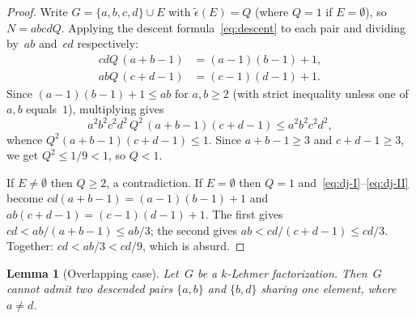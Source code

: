 \documentclass[11pt]{article}
\newtheorem{lemma}[theorem]{Lemma}
\theoremstyle{definition}
\theoremstyle{remark}
\newcommand{\eps}{\tilde{\epsilon}}
\begin{document}
\begin{proof}
Write $G = \{a, b, c, d\} \cup E$ with $\eps(E) = Q$ (where $Q = 1$ if
$E = \emptyset$), so $N = abcdQ$.  Applying the descent
formula~\eqref{eq:descent} to each pair and dividing by~$ab$ and~$cd$
respectively:
\begin{align}
  \label{eq:dj-I}
  cdQ\,(a+b-1) &= (a\!-\!1)(b\!-\!1)+1, \\
  \label{eq:dj-II}
  abQ\,(c+d-1) &= (c\!-\!1)(d\!-\!1)+1.
\end{align}
Since $(a-1)(b-1) + 1 \le ab$ for $a,b \ge 2$ (with strict inequality
unless one of $a, b$ equals~$1$), multiplying gives
\[
  a^2b^2c^2d^2\,Q^2\,(a\!+\!b\!-\!1)(c\!+\!d\!-\!1) \le a^2b^2c^2d^2,
\]
whence $Q^2(a+b-1)(c+d-1) \le 1$.  Since $a+b-1 \ge 3$ and $c+d-1 \ge 3$,
we get $Q^2 \le 1/9 < 1$, so $Q < 1$.

If $E \ne \emptyset$ then $Q \ge 2$, a contradiction.  If
$E = \emptyset$ then $Q = 1$ and~\eqref{eq:dj-I}--\eqref{eq:dj-II} become
$cd(a+b-1) = (a-1)(b-1)+1$ and $ab(c+d-1) = (c-1)(d-1)+1$.  The first
gives $cd < ab/(a+b-1) \le ab/3$; the second gives $ab < cd/(c+d-1) \le
cd/3$.  Together: $cd < ab/3 < cd/9$, which is absurd.
\end{proof}


\begin{lemma}[Overlapping case]\label{lem:overlap}
Let~$G$ be a $k$-Lehmer factorization.  Then~$G$ cannot admit two
descended pairs $\{a,b\}$ and $\{b,d\}$ sharing one element, where
$a \ne d$.
\end{lemma}
\end{document}
